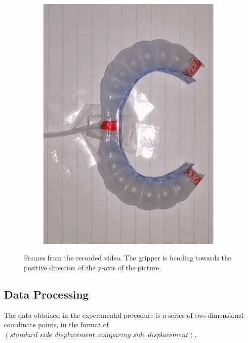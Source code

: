 \documentclass[conference]{IEEEtran}
\begin{document}
\begin{figure}[htbp]
\begin{subfigure}[b]{0.25\linewidth}
    \includegraphics[width=\linewidth]{pics/变形3.png}
    \caption{}
    \label{fig:image3}
  \end{subfigure}
  \caption{Frames from the recorded video. The gripper is bending towards the positive direction of the y-axis of the picture.}
  \label{fig:three_images}
\end{figure}

\subsection{Data Processing}
\label{Processing}

The data obtained in the experimental procedure is a series of two-dimensional coordinate points, in the format of $(\textit{standard side displacement}, \textit{comparing side displacement})$.
\end{document}
